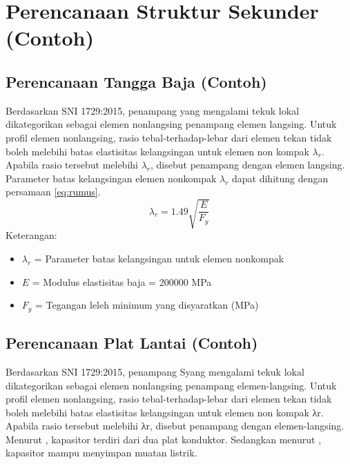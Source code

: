 \section{Perencanaan Struktur Sekunder (Contoh)}
\subsection{Perencanaan Tangga Baja (Contoh)}
Berdasarkan SNI 1729:2015, penampang yang mengalami tekuk lokal dikategorikan sebagai 
elemen nonlangsing penampang elemen langsing. Untuk profil elemen nonlangsing, rasio 
tebal-terhadap-lebar dari elemen tekan tidak boleh melebihi batas elastisitas kelangsingan 
untuk elemen non kompak $\lambda_r$. Apabila rasio tersebut melebihi $\lambda_r$, disebut 
penampang dengan elemen langsing. Parameter batas kelangsingan elemen nonkompak 
$\lambda_r$ dapat dihitung dengan persamaan \eqref{eq:rumus}.
\begin{equation}
    \lambda_r = 1.49 \sqrt{\frac{E}{F_y}}
    \label{eq:rumus}
\end{equation}
\noindent
Keterangan:
\begin{itemize}[label={},leftmargin=\parindent,itemsep=2pt,topsep=2pt]
  \item $\lambda_r$ = Parameter batas kelangsingan untuk elemen nonkompak
  \item $E$ = Modulus elastisitas baja = 200000 MPa
  \item $F_y$ = Tegangan leleh minimum yang disyaratkan (MPa)
\end{itemize}

\subsection{Perencanaan Plat Lantai (Contoh)}
Berdasarkan SNI 1729:2015, penampang Syang mengalami tekuk lokal dikategorikan sebagai elemen nonlangsing penampang elemen-langsing. Untuk profil elemen nonlangsing, rasio tebal-terhadap-lebar dari elemen tekan tidak boleh melebihi batas elastisitas kelangsingan untuk elemen non kompak λr. Apabila rasio tersebut melebihi λr, disebut penampang dengan elemen-langsing. Menurut \cite{alexandersadiku}, kapasitor terdiri dari dua plat konduktor. Sedangkan menurut \cite{varaprasad}, kapasitor mampu menyimpan muatan listrik.


